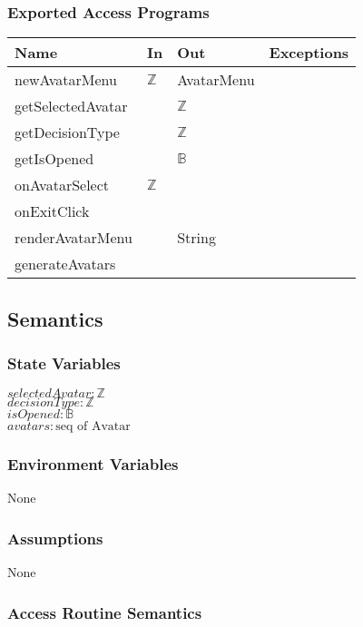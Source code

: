 \documentclass[12pt, titlepage]{article}
\begin{document}
\subsubsection{Exported Access Programs}

\begin{center}
\begin{tabular}{p{3.5cm} p{4cm} p{4cm} p{2cm}}
\hline
\textbf{Name} & \textbf{In} & \textbf{Out} & \textbf{Exceptions} \\
\hline
newAvatarMenu & $\mathbb{Z}$ & AvatarMenu & \\
\hline
getSelectedAvatar &  & $\mathbb{Z}$ & \\
\hline
getDecisionType &  & $\mathbb{Z}$ & \\
\hline
getIsOpened &  & $\mathbb{B}$ & \\
\hline
onAvatarSelect &  $\mathbb{Z}$ &  & \\
\hline
onExitClick &   &  & \\
\hline
renderAvatarMenu &  & String & \\
\hline
generateAvatars &  &  & \\
\hline
\end{tabular}
\end{center}

\subsection{Semantics}

\subsubsection{State Variables}
$\mathit{selectedAvatar}: \text{$\mathbb{Z}$}$\\
$\mathit{decisionType}: \text{$\mathbb{Z}$}$\\
$\mathit{isOpened}: \text{$\mathbb{B}$}$\\
$\mathit{avatars}: \text{seq of Avatar}$\\
\subsubsection{Environment Variables}
None

\subsubsection{Assumptions}
None

\subsubsection{Access Routine Semantics}
\end{document}
